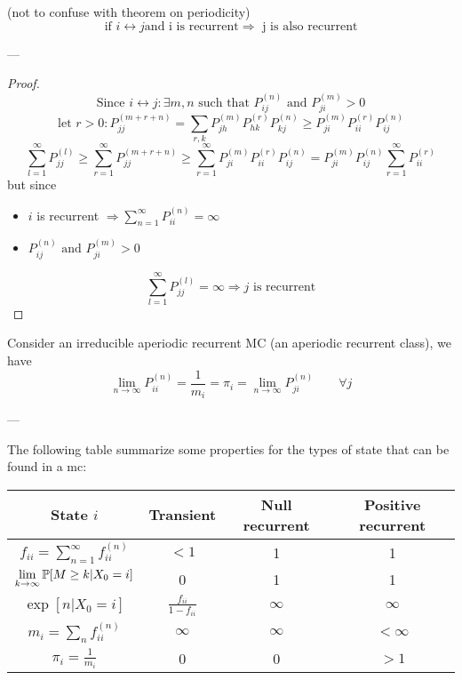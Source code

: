 	\begin{theorem}
		(not to confuse with theorem on periodicity)
		$$\text{if } i\leftrightarrow j \text{and i is recurrent} \Rightarrow \text{ j is also recurrent}$$
	\end{theorem}
	---
	\begin{proof}
		$$\text{Since } i\leftrightarrow j : \exists m,n \text{ such that } P_{ij}^{(n)} \text{ and } P_{ji}^{(m)} > 0$$
		$$\text{let } r>0 : P_{jj}^{(m+r+n)} = \sum\limits_{r, k} P_{jh}^{(m)} P_{hk}^{(r)} P_{kj}^{(n)} \geq P_{ji}^{(m)}  P_{ii}^{(r)}  P_{ij}^{(n)}$$
		$$\sum\limits_{l=1}^\infty P_{jj}^{(l)} \geq \sum\limits_{r=1}^\infty P_{jj}^{(m+r+n)} \geq \sum\limits_{r=1}^\infty P_{ji}^{(m)}  P_{ii}^{(r)}  P_{ij}^{(n)} = P_{ji}^{(m)} P_{ij}^{(n)} \sum\limits_{r=1}^\infty P_{ii}^{(r)}$$
		but since \begin{itemize}
		\item$i$ is recurrent $\Rightarrow \sum\limits_{n=1}^\infty P_{ii}^{(n)} = \infty$
		\item $P_{ij}^{(n)} \text{ and } P_{ji}^{(m)} > 0$
		\end{itemize}
		$$\sum\limits_{l=1}^\infty P_{jj}^{(l)} = \infty \Rightarrow j \text{ is recurrent}$$
	\end{proof}

	\begin{theorem}
		Consider an irreducible aperiodic recurrent MC (an aperiodic recurrent class), we have
		$$ \lim_{n\to \infty} P_{ii}^{(n)} = \frac{1}{m_i} = \pi_i = \lim_{n\to\infty} P_{ji}^{(n)} \qquad \forall j$$
	\end{theorem}

	---

	The following table summarize some properties for the types of state that can be found in a \gls{mc}:

	{\renewcommand{\arraystretch}{1.2}
	\begin{center}
		\begin{tabular}{|c||c|c|c|}
			\hline
			State $i$ & Transient & Null recurrent & Positive recurrent \\ \hline
			$f_{ii} = \sum\limits_{n=1}^\infty f_{ii}^{(n)}$ & $<1$ & 1 & 1 \\ \hline
			$\lim\limits_{k \to \infty } \mathbb{P}[M \geq k | X_0=i]$ & 0 & 1 & 1 \\ \hline
			$\exp[n|X_0=i]$ & $\frac{f_{ii}}{1-f_{ii}}$ & $\infty$ & $\infty$ \\ \hline
			$m_i = \sum\limits_n f_{ii}^{(n)}$ & $\infty$ & $\infty$ & $<\infty$ \\ \hline
			$\pi_i = \frac{1}{m_i}$ & 0 & 0 & $>1$ \\ \hline
		\end{tabular}
	\end{center}}

